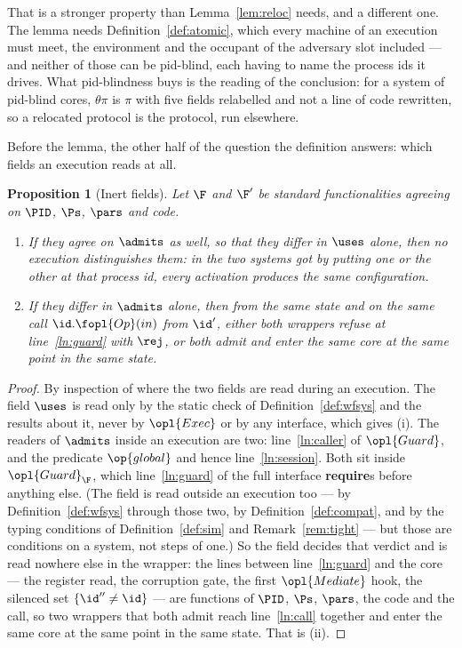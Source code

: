 \documentclass[10pt,oneside,openany]{book}
\theoremstyle{accentdef}
\theoremstyle{accentplain}
\newtheorem{proposition}[definition]{Proposition}
\begin{document}
That is a stronger property than Lemma~\ref{lem:reloc} needs, and a different one. The lemma needs
Definition~\ref{def:atomic}, which every machine of an execution must meet, the environment and the
occupant of the adversary slot included --- and neither of those can be pid-blind, each having to
name the process ids it drives. What pid-blindness buys is the reading of the conclusion: for a
system of pid-blind cores, $\theta\pi$ is $\pi$ with five fields relabelled and not a line of code
rewritten, so a relocated protocol is the protocol, run elsewhere.

Before the lemma, the other half of the question the definition answers: which fields an execution
reads at all.

\begin{proposition}[Inert fields]\label{prop:inert}
Let $\F$ and $\F'$ be standard functionalities agreeing on $\PID$, $\Ps$, $\pars$ and code.
\begin{enumerate}[label=(\roman*),leftmargin=2.2em]
  \item If they agree on $\admits$ as well, so that they differ in $\uses$ alone, then no execution
        distinguishes them: in the two systems got by putting one or the other at that process id,
        every activation produces the same configuration.
  \item If they differ in $\admits$ alone, then from the same state and on the same call
        $\id.\fopl{Op}(in)$ from $\id'$, either both wrappers refuse at line~\ref{ln:guard} with
        $\rej$, or both admit and enter the same core at the same point in the same state.
\end{enumerate}
\end{proposition}

\begin{proof}
By inspection of where the two fields are read during an execution. The field $\uses$ is read only by the
static check of Definition~\ref{def:wfsys} and the results about it, never by $\opl{Exec}$ or by any
interface, which gives (i). The readers of $\admits$ inside an execution are two: line~\ref{ln:caller}
of $\opl{Guard}$, and the predicate $\op{global}$ and hence line~\ref{ln:session}. Both sit inside
$\opl{Guard}_{\F}$, which line~\ref{ln:guard} of the full interface \textbf{require}s before
anything else. (The field is read outside an execution too --- by Definition~\ref{def:wfsys} through
those two, by Definition~\ref{def:compat}, and by the typing conditions of
Definition~\ref{def:sim} and Remark~\ref{rem:tight} --- but those are conditions on a system, not
steps of one.) So the field decides that verdict and is read nowhere else in the wrapper: the lines
between line~\ref{ln:guard} and the core --- the register read, the corruption gate, the first
$\opl{Mediate}$ hook, the silenced set $\{\id'' \neq \id\}$ --- are functions of $\PID$, $\Ps$,
$\pars$, the code and the call, so two wrappers that both admit reach line~\ref{ln:call} together
and enter the same core at the same point in the same state. That is (ii).
\end{proof}
\end{document}
